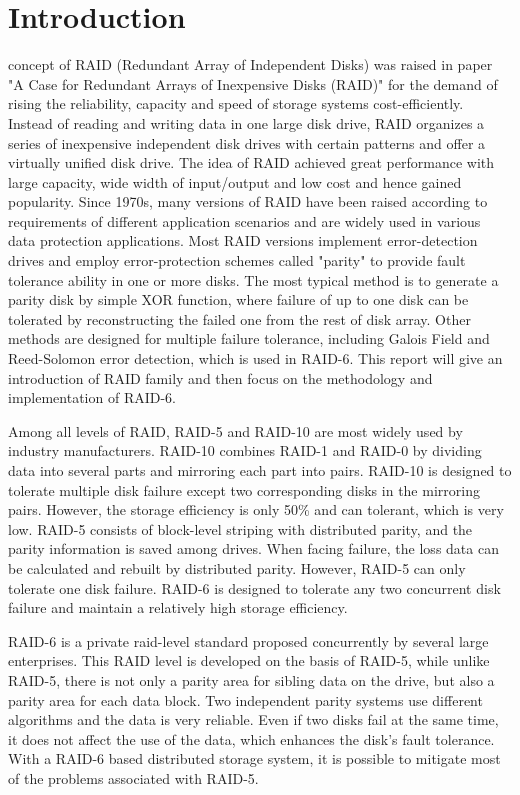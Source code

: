 \documentclass[journal]{IEEEtran}
\begin{document}
\section{Introduction}
 concept of RAID (Redundant Array of Independent Disks) was raised in  paper "A Case for Redundant Arrays of Inexpensive Disks (RAID)"\cite{raid} for the demand of rising the reliability, capacity and speed of storage systems cost-efficiently. Instead of reading and writing data in one large disk drive, RAID organizes a series of inexpensive independent disk drives with certain patterns and offer a virtually unified disk drive. The idea of RAID achieved great performance with large capacity, wide width of input/output and low cost and hence gained popularity. Since 1970s, many versions of RAID have been raised according to requirements of different application scenarios and are widely used in various data protection applications. Most RAID versions implement error-detection drives and employ error-protection schemes called "parity" to provide fault tolerance ability in one or more disks. The most typical method is to generate a parity disk by simple XOR function\cite{evenodd}, where failure of up to one disk can be tolerated by reconstructing the failed one from the rest of disk array. Other methods are designed for multiple failure tolerance, including Galois Field and Reed-Solomon error detection\cite{tutorial}\cite{mds}, which is used in RAID-6. This report will give an introduction of RAID family and then focus on the methodology and implementation of RAID-6.


Among all levels of RAID, RAID-5 and RAID-10 are most widely used by industry manufacturers. RAID-10 combines RAID-1 \cite{raid1}and RAID-0\cite{raid0} by dividing data into several parts and mirroring each part into pairs. RAID-10 is designed to tolerate multiple disk failure except two corresponding disks in the mirroring pairs. However, the storage efficiency is only 50\% and can tolerant, which is very low. RAID-5 consists of block-level striping with distributed parity, and the parity information is saved among drives. When facing failure, the loss data can be calculated and rebuilt by distributed parity. However, RAID-5 can only tolerate one disk failure. RAID-6 is designed to tolerate any two concurrent disk failure and maintain a relatively high storage efficiency.


RAID-6 is a private raid-level standard proposed concurrently by several large enterprises. This RAID level is developed on the basis of RAID-5, while unlike RAID-5, there is not only a parity area for sibling data on the drive, but also a parity area for each data block. Two independent parity systems use different algorithms and the data is very reliable. Even if two disks fail at the same time, it does not affect the use of the data, which enhances the disk’s fault tolerance. With a RAID-6 based distributed storage system, it is possible to mitigate most of the problems associated with RAID-5.
\end{document}
